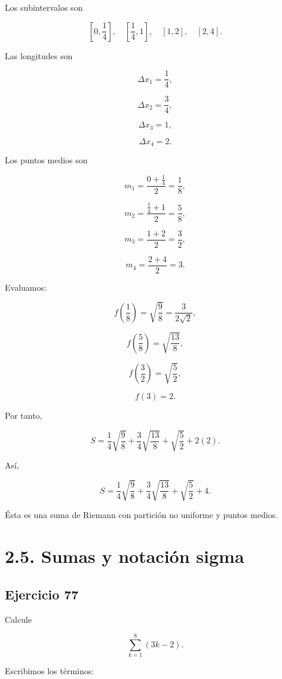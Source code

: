 \documentclass[12pt]{article}
\begin{document}
Los subintervalos son

\[
\left[0,\frac14\right],
\quad
\left[\frac14,1\right],
\quad
[1,2],
\quad
[2,4].
\]

Las longitudes son

\[
\Delta x_1=\frac14,
\]

\[
\Delta x_2=\frac34,
\]

\[
\Delta x_3=1,
\]

\[
\Delta x_4=2.
\]

Los puntos medios son

\[
m_1
=
\frac{0+\frac14}{2}
=
\frac18,
\]

\[
m_2
=
\frac{\frac14+1}{2}
=
\frac58,
\]

\[
m_3
=
\frac{1+2}{2}
=
\frac32,
\]

\[
m_4
=
\frac{2+4}{2}
=
3.
\]

Evaluamos:

\[
f\left(\frac18\right)
=
\sqrt{\frac98}
=
\frac{3}{2\sqrt2},
\]

\[
f\left(\frac58\right)
=
\sqrt{\frac{13}{8}},
\]

\[
f\left(\frac32\right)
=
\sqrt{\frac52},
\]

\[
f(3)=2.
\]

Por tanto,

\[
S
=
\frac14\sqrt{\frac98}
+
\frac34\sqrt{\frac{13}{8}}
+
\sqrt{\frac52}
+
2(2).
\]

Así,

\[
\boxed{
S
=
\frac14\sqrt{\frac98}
+
\frac34\sqrt{\frac{13}{8}}
+
\sqrt{\frac52}
+
4
}.
\]

Ésta es una suma de Riemann con partición no uniforme y puntos medios.

\section*{2.5. Sumas y notación sigma}

\subsection*{Ejercicio 77}

Calcule

\[
\sum_{k=1}^{8}(3k-2).
\]

Escribimos los términos:
\end{document}

